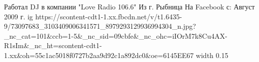  
 
 
 
 

\par
Работал DJ в компании "Love Radio 106.6"
Из г. Рыбница
На Facebook с: Август 2009 г.
\ifcmt
  ig https://scontent-cdt1-1.xx.fbcdn.net/v/t1.6435-9/73097683_3103409006341571_8979293129936994304_n.jpg?_nc_cat=101&ccb=1-5&_nc_sid=09cbfe&_nc_ohc=iIOrM7k8Cu4AX-R1sIm&_nc_ht=scontent-cdt1-1.xx&oh=55c1ac5018f0727b2aa9d92c1a892dc0&oe=6145EE67
  width 0.15
\fi

